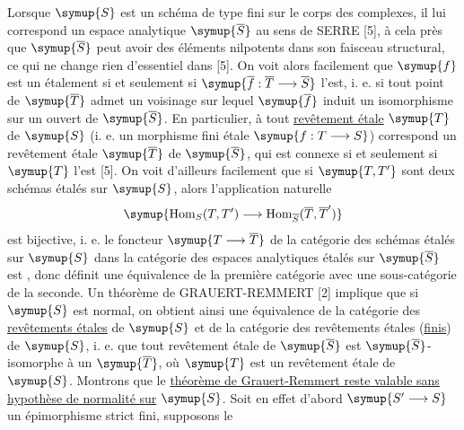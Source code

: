 Lorsque $\symup{S}$ est un schéma de type fini sur le corps des complexes, il lui
correspond un espace analytique $\symup{\overline S}$ au sens de SERRE [5], à cela près
que $\symup{\overline S}$ peut avoir des éléments nilpotents dans son faisceau
structural, ce qui ne change rien d'essentiel dans [5]. On voit alors facilement
que $\symup{f}$ est un étalement si et seulement si
$\symup{\overline f:\overline T\longrightarrow\overline S}$ l'est, i. e. si tout point
de $\symup{\overline T}$ admet un voisinage sur lequel $\symup{\overline f}$ induit un
isomorphisme sur un ouvert de $\symup{\overline S}$. En particulier, à tout
\uline{revêtement étale} $\symup{T}$ de $\symup{S}$ (i. e. un morphisme fini étale
$\symup{f:T\longrightarrow S}$) correspond un revêtement étale $\symup{\overline T}$ de
$\symup{\overline S}$, qui est connexe si et seulement si $\symup{T}$ l'est [5]. On voit
d'ailleurs facilement que si $\symup{T,T'}$ sont deux schémas étalés sur $\symup{S}$, alors
l'application naturelle
\[
  \symup{\operatorname{Hom}_S(T,T')\longrightarrow
  \operatorname{Hom}_{\overline S}(\overline T,\overline T')}
\]
est bijective, i. e. le foncteur $\symup{T\longrightarrow\overline T}$ de la catégorie des
schémas étalés sur $\symup{S}$ dans la catégorie des espaces analytiques étalés sur
$\symup{\overline S}$ est , donc définit une équivalence de la
première catégorie avec une sous-catégorie de la seconde. Un théorème de
GRAUERT-REMMERT [2] implique que si $\symup{S}$ est normal, on obtient ainsi une
équivalence de la catégorie des \uline{revêtements étales} de $\symup{S}$ et de la
catégorie des revêtements étales (\uline{finis}) de $\symup{S}$, i. e. que tout
revêtement étale de $\symup{\overline S}$ est $\symup{\overline S}$-isomorphe à un
$\symup{\overline T}$, où $\symup{T}$ est un revêtement étale de $\symup{S}$. Montrons que le
\uline{théorème de Grauert-Remmert reste valable sans hypothèse de normalité sur}
$\symup{S}$. Soit en effet d'abord $\symup{S'\longrightarrow S}$ un épimorphisme strict fini,
supposons le

